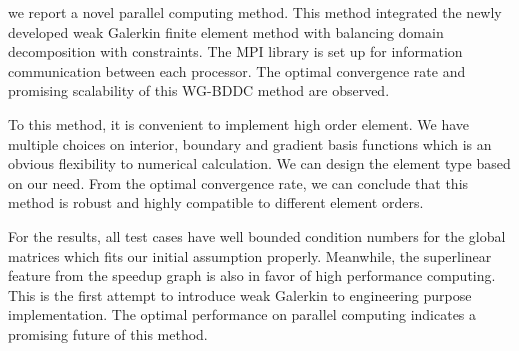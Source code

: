 				
	we report a novel parallel computing method. This method integrated the newly developed weak Galerkin finite element method with balancing domain decomposition with constraints. The MPI library is set up for information communication between each processor. The optimal convergence rate and promising scalability of this WG-BDDC method are observed.
	
	To this method, it is convenient to implement high order element. We have multiple choices on interior, boundary and gradient basis functions which is an obvious flexibility to numerical calculation. We can design the element type based on our need. From the optimal convergence rate, we can conclude that this method is robust and highly compatible to different element orders.
	
	For the results, all test cases have well bounded condition numbers for the global matrices which fits our initial assumption properly. Meanwhile, the superlinear feature from the speedup graph is also in favor of high performance computing. This is the first attempt to introduce weak Galerkin to engineering purpose implementation. The optimal performance on parallel computing indicates a promising future of this method.